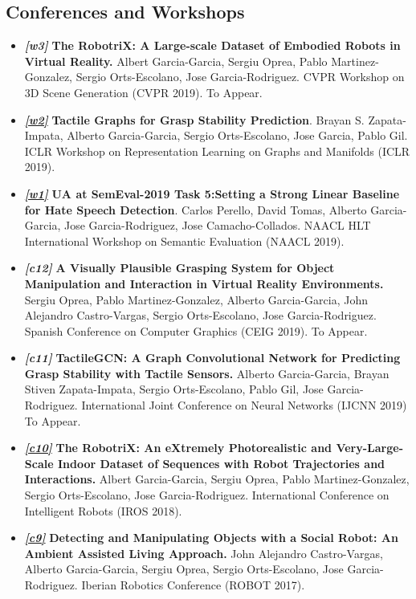\documentclass[8pt]{article}
\begin{document}
\subsection*{Conferences and Workshops}

\begin{itemize}
    \item \emph{\textbf{[w3]}} \textbf{The RobotriX: A Large-scale Dataset of Embodied Robots in Virtual Reality.} Albert Garcia-Garcia, Sergiu Oprea, Pablo Martinez-Gonzalez, Sergio Orts-Escolano, Jose Garcia-Rodriguez. CVPR Workshop on 3D Scene Generation (CVPR 2019). To Appear.
    \item \emph{\textbf{\href{https://rlgm.github.io/papers/7.pdf}{[w2]}}} \textbf{Tactile Graphs for Grasp Stability Prediction}. Brayan S. Zapata-Impata, Alberto Garcia-Garcia, Sergio Orts-Escolano, Jose Garcia, Pablo Gil. ICLR Workshop on Representation Learning on Graphs and Manifolds (ICLR 2019).
    \item \emph{\textbf{\href{http://alt.qcri.org/semeval2019/data/uploads/semeval2019-proceedings.pdf}{[w1]}}} \textbf{UA at SemEval-2019 Task 5:Setting a Strong Linear Baseline for Hate Speech Detection}. Carlos Perello, David Tomas, Alberto Garcia-Garcia, Jose Garcia-Rodriguez, Jose Camacho-Collados. NAACL HLT International Workshop on Semantic Evaluation (NAACL 2019).
    \item \emph{\textbf{[c12]}} \textbf{A Visually Plausible Grasping System for Object Manipulation and Interaction in Virtual Reality Environments.} Sergiu Oprea, Pablo Martinez-Gonzalez, Alberto Garcia-Garcia, John Alejandro Castro-Vargas, Sergio Orts-Escolano, Jose Garcia-Rodriguez. Spanish Conference on Computer Graphics (CEIG 2019). To Appear.
    \item \emph{\textbf{[c11]}} \textbf{TactileGCN: A Graph Convolutional Network for Predicting Grasp Stability with Tactile Sensors.} Alberto Garcia-Garcia, Brayan Stiven Zapata-Impata, Sergio Orts-Escolano, Pablo Gil, Jose Garcia-Rodriguez. International Joint Conference on Neural Networks (IJCNN 2019) To Appear.
    \item \emph{\textbf{\href{https://ieeexplore.ieee.org/document/8594495}{[c10]}}} \textbf{The RobotriX: An eXtremely Photorealistic and Very-Large-Scale Indoor Dataset of Sequences with Robot Trajectories and Interactions.} Albert Garcia-Garcia, Sergiu Oprea, Pablo Martinez-Gonzalez, Sergio Orts-Escolano, Jose Garcia-Rodriguez. International Conference on Intelligent Robots (IROS 2018).
    \item \emph{\textbf{\href{https://link.springer.com/chapter/10.1007/978-3-319-70833-1_50}{[c9]}}} \textbf{Detecting and Manipulating Objects with a Social Robot: An Ambient Assisted Living Approach.} John Alejandro Castro-Vargas, Alberto Garcia-Garcia, Sergiu Oprea, Sergio Orts-Escolano, Jose Garcia-Rodriguez. Iberian Robotics Conference (ROBOT 2017).

\end{itemize}
\end{document}

